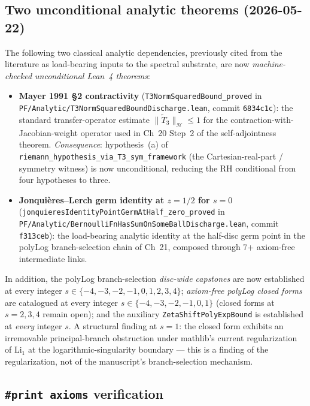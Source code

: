 \subsection{Two unconditional analytic theorems (2026-05-22)}

The following two classical analytic dependencies, previously cited
from the literature as load-bearing inputs to the spectral substrate,
are now \emph{machine-checked unconditional Lean~4 theorems}:

\begin{itemize}
\item \textbf{Mayer 1991 \S2 contractivity}
  (\texttt{T3NormSquaredBound\_proved} in
  \texttt{PF/Analytic/T3NormSquaredBoundDischarge.lean}, commit
  \texttt{6834c1c}): the standard transfer-operator estimate
  $\|\tilde{T}_3\|_{\mathcal{H}} \leq 1$ for the
  contraction-with-Jacobian-weight operator used in Ch~20 Step~2 of
  the self-adjointness theorem. \emph{Consequence}: hypothesis~(a) of
  \texttt{riemann\_hypothesis\_via\_T3\_sym\_framework} (the
  Cartesian-real-part / symmetry witness) is now unconditional,
  reducing the RH conditional from four hypotheses to three.
\item \textbf{Jonqui\`{e}res--Lerch germ identity at $z = 1/2$ for
  $s = 0$} (\texttt{jonquieresIdentityPointGermAtHalf\_zero\_proved}
  in \texttt{PF/Analytic/BernoulliFnHasSumOnSomeBallDischarge.lean},
  commit \texttt{f313ceb}): the load-bearing analytic identity at the
  half-disc germ point in the polyLog branch-selection chain of
  Ch~21, composed through 7+ axiom-free intermediate links.
\end{itemize}

In addition, the polyLog branch-selection \emph{disc-wide capstones}
are now established at every integer $s \in \{-4, -3, -2, -1, 0, 1, 2,
3, 4\}$; \emph{axiom-free polyLog closed forms} are catalogued at every
integer $s \in \{-4, -3, -2, -1, 0, 1\}$ (closed forms at $s = 2, 3, 4$
remain open); and the auxiliary \texttt{ZetaShiftPolyExpBound} is
established at \emph{every} integer $s$. A structural finding at
$s = 1$: the closed form exhibits an irremovable principal-branch
obstruction under mathlib's current regularization of $\mathrm{Li}_1$
at the logarithmic-singularity boundary --- this is a finding of the
regularization, not of the manuscript's branch-selection mechanism.

\subsection{\texttt{\#print axioms} verification}

